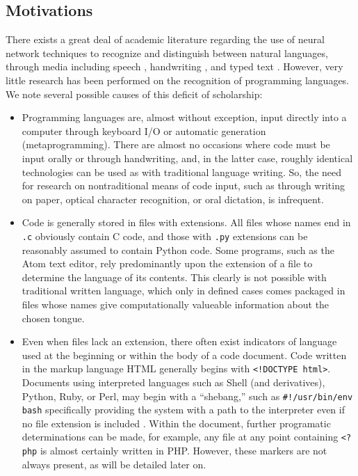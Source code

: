 \documentclass{article}
\begin{document}
\subsection{Motivations}
There exists a great deal of academic literature regarding the use of neural network techniques to recognize and distinguish between natural languages, through media including speech \cite{rnnspoken}\cite{dcrnnspoken}, handwriting \cite{handwritingex}, and typed text \cite{langidnn}\cite{langidstanford}. However, very little research has been performed on the recognition of programming languages. We note several possible causes of this deficit of scholarship:
\begin{itemize}
    \item{Programming languages are, almost without exception, input directly into a computer through keyboard I/O or automatic generation (metaprogramming). There are almost no occasions where code must be input orally or through handwriting, and, in the latter case, roughly identical technologies can be used as with traditional language writing. So, the need for research on nontraditional means of code input, such as through writing on paper, optical character recognition, or oral dictation, is infrequent.}
    \item{Code is generally stored in files with extensions. All files whose names end in \texttt{.c} obviously contain C code, and those with \texttt{.py} extensions can be reasonably assumed to contain Python code. Some programs, such as the Atom text editor, rely predominantly upon the extension of a file to determine the language of its contents. This clearly is not possible with traditional written language, which only in defined cases comes packaged in files whose names give computationally valueable information about the chosen tongue.}
    \item{Even when files lack an extension, there often exist indicators of language used at the beginning or within the body of a code document. Code written in the markup language \cite{htmlnotproglang} HTML generally begins with \texttt{<!DOCTYPE html>}. Documents using interpreted languages such as Shell (and derivatives), Python, Ruby, or Perl, may begin with a ``shebang,'' such as \texttt{#!/usr/bin/env bash} specifically providing the system with a path to the interpreter even if no file extension is included \cite{shebang}. Within the document, further programatic determinations can be made, for example, any file at any point containing \texttt{<?php} is almost certainly written in PHP. However, these markers are not always present, as will be detailed later on.}
\end{itemize}
\end{document}

